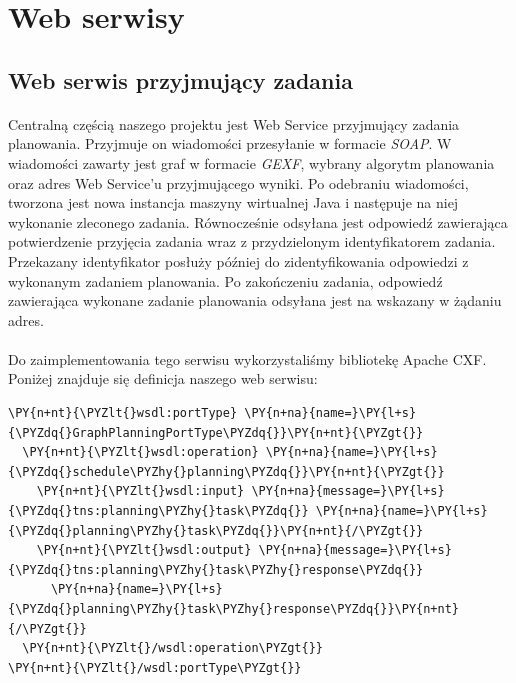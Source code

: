 \section{Web serwisy}
\label{sec:webservices}

\subsection{Web serwis przyjmujący zadania}
\paragraph{}
Centralną częścią naszego projektu jest Web Service przyjmujący zadania planowania. 
Przyjmuje on wiadomości przesyłanie w formacie {\it SOAP}.
W wiadomości zawarty jest graf w formacie {\it GEXF}, wybrany algorytm planowania oraz adres Web Service'u przyjmującego wyniki.
Po odebraniu wiadomości, tworzona jest nowa instancja maszyny wirtualnej Java i następuje na niej wykonanie zleconego zadania.
Równocześnie odsyłana jest odpowiedź zawierająca potwierdzenie przyjęcia zadania wraz z przydzielonym identyfikatorem zadania.
Przekazany identyfikator posłuży później do zidentyfikowania odpowiedzi z wykonanym zadaniem planowania.
Po zakończeniu zadania, odpowiedź zawierająca wykonane zadanie planowania odsyłana jest na wskazany w żądaniu adres.

\paragraph{}
Do zaimplementowania tego serwisu wykorzystaliśmy bibliotekę Apache CXF.
Poniżej znajduje się definicja naszego web serwisu:

\begin{program}
\begin{code}
\begin{Verbatim}[commandchars=\\\{\}]
\PY{n+nt}{\PYZlt{}wsdl:portType} \PY{n+na}{name=}\PY{l+s}{\PYZdq{}GraphPlanningPortType\PYZdq{}}\PY{n+nt}{\PYZgt{}}
  \PY{n+nt}{\PYZlt{}wsdl:operation} \PY{n+na}{name=}\PY{l+s}{\PYZdq{}schedule\PYZhy{}planning\PYZdq{}}\PY{n+nt}{\PYZgt{}}
    \PY{n+nt}{\PYZlt{}wsdl:input} \PY{n+na}{message=}\PY{l+s}{\PYZdq{}tns:planning\PYZhy{}task\PYZdq{}} \PY{n+na}{name=}\PY{l+s}{\PYZdq{}planning\PYZhy{}task\PYZdq{}}\PY{n+nt}{/\PYZgt{}}
    \PY{n+nt}{\PYZlt{}wsdl:output} \PY{n+na}{message=}\PY{l+s}{\PYZdq{}tns:planning\PYZhy{}task\PYZhy{}response\PYZdq{}} 
      \PY{n+na}{name=}\PY{l+s}{\PYZdq{}planning\PYZhy{}task\PYZhy{}response\PYZdq{}}\PY{n+nt}{/\PYZgt{}}
  \PY{n+nt}{\PYZlt{}/wsdl:operation\PYZgt{}}
\PY{n+nt}{\PYZlt{}/wsdl:portType\PYZgt{}}
\end{Verbatim}
\end{code}
\end{program}

